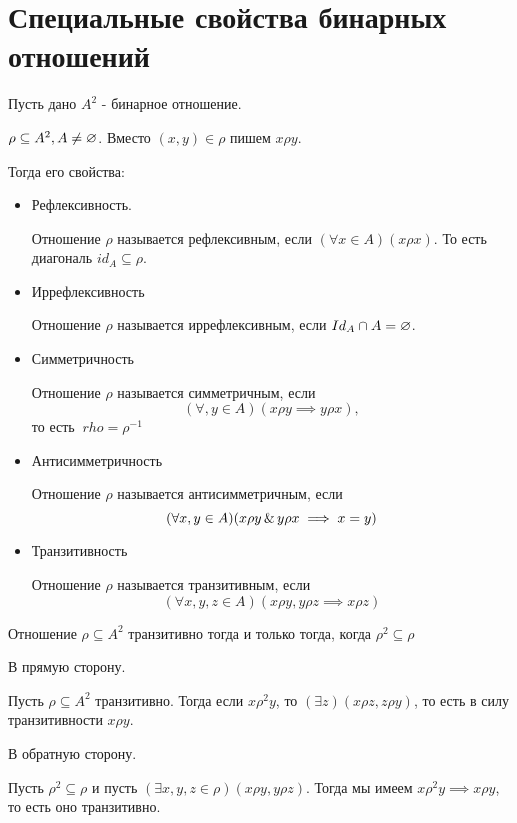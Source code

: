 

\title{}
\author{Козырнов Александр Дмитриевич, ИУ7-32Б}
\date{\today}


\section{Специальные свойства бинарных отношений}

Пусть дано $A^2$ - бинарное отношение.

$\rho \subseteq A^2, A\neq \varnothing$. Вместо $(x,y) \in \rho$ пишем
$x\rho y$.

Тогда его свойства:
\begin{itemize}
	\item Рефлексивность.

		Отношение $\rho$ называется рефлексивным, если  $(\forall x \in A)(x\rho x)$.
		То есть диагональ $id_A \subseteq \rho$.
	\item Иррефлексивность

		Отношение $\rho$ называется иррефлексивным, если $Id_A \cap A = \varnothing$.
	\item Симметричность

		Отношение  $\rho$ называется симметричным, если \[
			(\forall ,y \in A)(x\rho y \implies y\rho x),
		\]
		то есть $\ rho = \rho^{-1}$
	\item Антисимметричность

		Отношение $\rho$ называется антисимметричным, если
		$$
			(\forall x,y \in A)(x\rho y \operatorname{\&} y\rho x \implies x = y)
			$$
	\item Транзитивность

		Отношение $\rho$ называется транзитивным, если  \[
			(\forall x,y,z \in A)(x\rho y, y\rho z \implies x\rho z)
		\] 
\end{itemize}

\begin{theorem}
Отношение $\rho \subseteq A^2$ транзитивно тогда и только тогда, когда $\rho^2 \subseteq \rho$
\end{theorem}

\begin{myproof}
В прямую сторону.

Пусть $\rho \subseteq A^2$ транзитивно. Тогда если $x\rho^2 y$, то
$(\exists z)(x\rho z, z\rho y)$, то есть в силу транзитивности $x\rho y$.

\medskip

В обратную сторону.

Пусть  $\rho^2 \subseteq \rho$ и пусть $(\exists x,y,z \in \rho)(x\rho y, y\rho z)$.
Тогда мы имеем $x\rho^2 y \implies x\rho y$, то есть оно транзитивно.
\end{myproof}

